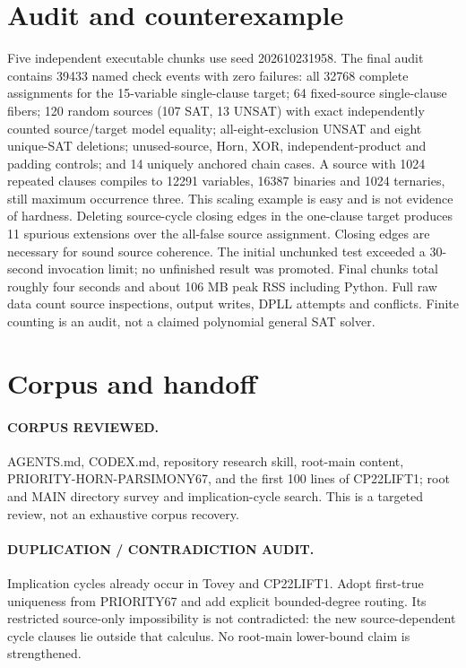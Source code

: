 \documentclass[11pt]{article}
\begin{document}
\section{Audit and counterexample}
Five independent executable chunks use seed 202610231958. The final audit contains 39433 named check events with zero failures: all 32768 complete assignments for the 15-variable single-clause target; 64 fixed-source single-clause fibers; 120 random sources (107 SAT, 13 UNSAT) with exact independently counted source/target model equality; all-eight-exclusion UNSAT and eight unique-SAT deletions; unused-source, Horn, XOR, independent-product and padding controls; and 14 uniquely anchored chain cases. A source with 1024 repeated clauses compiles to 12291 variables, 16387 binaries and 1024 ternaries, still maximum occurrence three. This scaling example is easy and is not evidence of hardness.
Deleting source-cycle closing edges in the one-clause target produces 11 spurious extensions over the all-false source assignment. Closing edges are necessary for sound source coherence.
The initial unchunked test exceeded a 30-second invocation limit; no unfinished result was promoted. Final chunks total roughly four seconds and about 106 MB peak RSS including Python. Full raw data count source inspections, output writes, DPLL attempts and conflicts. Finite counting is an audit, not a claimed polynomial general SAT solver.

\section{Corpus and handoff}
\paragraph{CORPUS REVIEWED.} AGENTS.md, CODEX.md, repository research skill, root-main content, PRIORITY-HORN-PARSIMONY67, and the first 100 lines of CP22LIFT1; root and MAIN directory survey and implication-cycle search. This is a targeted review, not an exhaustive corpus recovery.
\paragraph{DUPLICATION / CONTRADICTION AUDIT.} Implication cycles already occur in Tovey and CP22LIFT1. Adopt first-true uniqueness from PRIORITY67 and add explicit bounded-degree routing. Its restricted source-only impossibility is not contradicted: the new source-dependent cycle clauses lie outside that calculus. No root-main lower-bound claim is strengthened.
\end{document}

